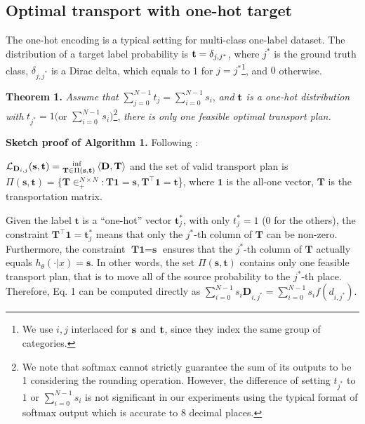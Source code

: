 \documentclass{article}
\theoremstyle{plain}%
\begin{document}
 


\subsection{Optimal transport with one-hot target}



The one-hot encoding is a typical setting for multi-class one-label dataset. The distribution of a target label probability is ${\rm\textbf{t}}=\delta_{j,j^*}$, where $j^*$ is the ground truth class, $\delta_{j,j^*}$ is a Dirac delta, which equals to 1 for $j=j^*$\footnote{\noindent We use $i,j$ interlaced for ${\rm \textbf{s}}$ and ${\rm \textbf{t}}$, since they index the same group of categories.}, and $0$ otherwise. 



\vspace{+5pt}
\noindent\textbf{Theorem 1.} \textit{Assume that} $\sum_{j=0}^{N-1}t_j=\sum_{i=0}^{N-1}s_i$, \textit{and} ${\rm{\textbf{t}}}$ \textit{is a one-hot distribution with} $t_{j^*}=1 ($or $\sum_{i=0}^{N-1}s_i)$\footnote{We note that softmax cannot strictly guarantee the sum of its outputs to be 1 considering the rounding operation. However, the difference of setting $t_{j^*}$ to $1$ or $\sum_{i=0}^{N-1}s_i$ is not significant in our experiments using the typical format of softmax output which is accurate to 8 decimal places.}, \textit{there is only one feasible optimal transport plan.}  

\vspace{+5pt}
\noindent\textbf{Sketch proof of Algorithm 1.} Following \cite{cuturi2013sinkhorn}:

$\mathcal{L}_{\textbf{D}_{i,j}}({\rm{\textbf{s},\textbf{t}}})=\mathop{}_{\textbf{T}\in\Pi(\textbf{s},\textbf{t})}^{{\rm ~~~inf}}  \left \langle \textbf{D},\textbf{T}  \right \rangle $ and the set of valid transport plan is $\Pi(\textbf{s},\textbf{t})=\{\textbf{T}\in^{N\times N}_{+}: \textbf{T}\textbf{1}=\textbf{s},\textbf{T}^{\top}\textbf{1}=\textbf{t}$\}, where $\textbf{1}$ is the all-one vector, $\textbf{T}$ is the transportation matrix. \vspace{+5pt}

Given the label $\textbf{t}$ is a ``one-hot'' vector $\textbf{t}_j^*$, with only $t_j^*=1$ (0 for the others), the constraint $\textbf{T}^{\top}\textbf{1}=\textbf{t}_j^*$ means that only the $j^*$-th column of $\textbf{T}$ can be non-zero. Furthermore, the constraint $\textbf{T}\textbf{1}=\textbf{s}$ ensures that the $j^*$-th column of $\textbf{T}$ actually equals $h_{{\theta}}(\cdot|x)=\textbf{s}$. In other words, the set $\Pi(\textbf{s},\textbf{t})$ contains only one feasible transport plan, that is to move all of the source probability to the $j^*$-th place. Therefore, Eq. 1 can be computed directly as $\sum_{i=0}^{N-1} s_i \textbf{D}_{i,j^*} =\sum_{i=0}^{N-1} s_i f(d_{i,j^*})$. 
\end{document}
